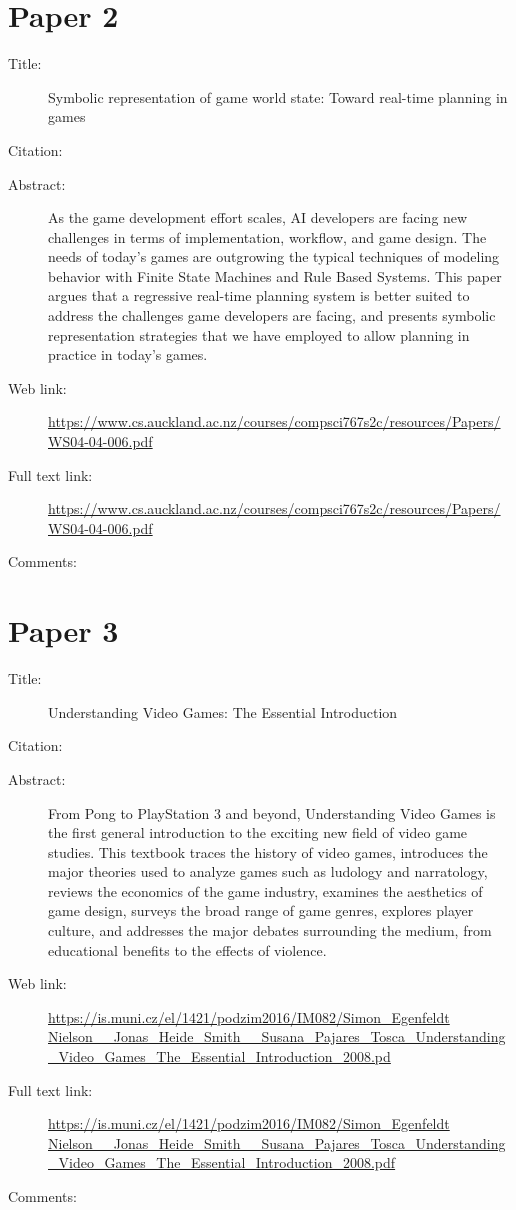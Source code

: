 \documentclass{scrartcl}
\begin{document}
\section*{Paper 2}
\begin{description}
\item[Title:]Symbolic representation of game world state: Toward real-time planning in games
\item[Citation:] \cite{jefforkin}
\item[Abstract:] As the game development effort scales, AI developers are facing new challenges in terms of implementation, workflow, and game design. The needs of today’s games are outgrowing the typical techniques of modeling behavior with Finite State Machines and Rule Based Systems. This paper argues that a regressive real-time planning system is better suited to address the challenges game developers are facing, and presents symbolic representation strategies that
we have employed to allow planning in practice in today’s games. 
\item[Web link:]\url{https://www.cs.auckland.ac.nz/courses/compsci767s2c/resources/Papers/WS04-04-006.pdf}
\item[Full text link:]\url {https://www.cs.auckland.ac.nz/courses/compsci767s2c/resources/Papers/WS04-04-006.pdf}
\item[Comments:]
\end{description}

\section*{Paper 3}
\begin{description}
\item[Title:]Understanding Video Games: The Essential Introduction
\item[Citation:] \cite{simon}
\item[Abstract:] From Pong to PlayStation 3 and beyond, Understanding Video Games is the first general introduction to the exciting new field of video game studies. This textbook traces the history of video games, introduces the major theories used to analyze games such as ludology and narratology, reviews the economics of the game industry, examines the aesthetics of game design, surveys the broad range of game genres, explores player culture, and addresses the major debates surrounding the medium, from educational benefits to the effects of violence.
\item[Web link:] \url{https://is.muni.cz/el/1421/podzim2016/IM082/Simon_Egenfeldt Nielson__Jonas_Heide_Smith__Susana_Pajares_Tosca_Understanding_Video_Games_The_Essential_Introduction_2008.pd}
\item[Full text link:]\url{https://is.muni.cz/el/1421/podzim2016/IM082/Simon_Egenfeldt Nielson__Jonas_Heide_Smith__Susana_Pajares_Tosca_Understanding_Video_Games_The_Essential_Introduction_2008.pdf}
\item[Comments:] 
\end{description}
\end{document}
